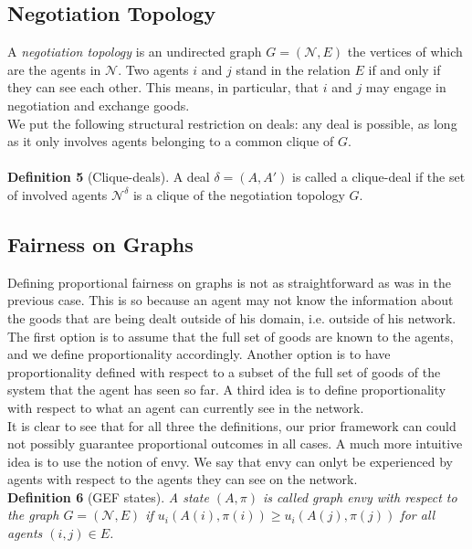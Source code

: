 \documentclass{article}
\begin{document}
\subsection{Negotiation Topology}
A \textit{negotiation topology} is an undirected graph $G = (\mathcal{N}, E)$ the vertices of which are the agents in $\mathcal{N}$. Two agents $i$ and $j$ stand in the relation $E$ if and only if they can see each other. This means, in particular, that $i$ and $j$ may engage in negotiation and exchange goods. \\
We put the following structural restriction on deals: any deal is possible, as long as it only involves agents belonging to a common clique of $G$. \\ \\
\textbf{Definition 5} (Clique-deals). A deal $\delta = (A, A')$ is called a clique-deal if the set of involved agents $\mathcal{N}^\delta$ is a clique of the negotiation topology $G$.
\subsection{Fairness on Graphs}
Defining proportional fairness on graphs is not as straightforward as was in the previous case. This is so because an agent may not know the information about the goods that are being dealt outside of his domain, i.e. outside of his network. The first option is to assume that the full set of goods are known to the agents, and we define proportionality accordingly. Another option is to have proportionality defined with respect to a subset of the full set of goods of the system that the agent has seen so far. A third idea is to define proportionality with respect to what an agent can currently see in the network. \\
It is clear to see that for all three the definitions, our prior framework can could not possibly guarantee proportional outcomes in all cases. A much more intuitive idea is to use the notion of envy. We say that envy can onlyt be experienced by agents with respect to the agents they can see on the network. \\
\textbf{Definition 6} (GEF states).\textit{ A state $(A, \pi)$ is called graph envy with respect to the graph $G = (\mathcal{N}, E)$ if $u_i(A(i),\pi(i)) \geq u_i(A(j),\pi(j))$ for all agents $(i,j) \in E$.}
\end{document}
